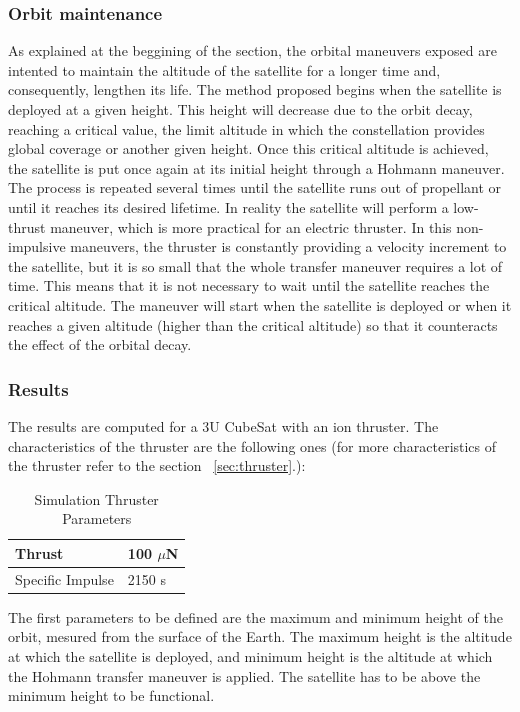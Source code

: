 \subsubsection{Orbit maintenance}
As explained at the beggining of the section, the orbital maneuvers exposed are intented to maintain the altitude of the satellite for a longer time and, consequently, lengthen its life.
The method proposed begins when the satellite is deployed at a given height. This height will decrease due to the orbit decay, reaching a critical value, the limit altitude in which the constellation provides global coverage or another given height. Once this critical altitude is achieved, the satellite is put once again at its initial height through a Hohmann maneuver.
The process is repeated several times until the satellite runs out of propellant or until it reaches its desired lifetime.
\newline
In reality the satellite will perform a low-thrust maneuver, which is more practical for an electric thruster. In this non-impulsive maneuvers, the thruster is constantly providing a velocity increment to the satellite, but it is so small that the whole transfer maneuver requires a lot of time. This means that it is not necessary to wait until the satellite reaches the critical altitude. The maneuver will start when the satellite is deployed or when it reaches a given altitude (higher than the critical altitude) so that it counteracts the effect of the orbital decay.

\subsubsection{Results}
The results are computed for a 3U CubeSat with an ion thruster. The characteristics of the thruster are the following ones (for more characteristics of the thruster refer to the section ~\ref{sec:thruster}.):

\begin{table}
\begin{center}
\begin{tabular}{ | l | l | }
\hline
Thrust & 100 $\mu$N \\ 
\hline 
Specific Impulse & 2150 s \\
\hline
\end{tabular}
\caption{Simulation Thruster Parameters}
\end{center}
\end{table}

\noindent
The first parameters to be defined are the maximum and minimum height of the orbit, mesured from the surface of the Earth. The maximum height is the altitude at which the satellite is deployed, and minimum height is the altitude at which the Hohmann transfer maneuver is applied. The satellite has to be above the minimum height to be functional.

